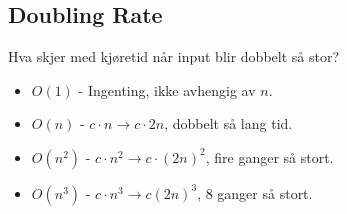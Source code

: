 \documentclass{article}
\begin{document}
\subsection{Doubling Rate}
Hva skjer med kjøretid når input blir dobbelt så stor?

\begin{itemize}
    \item \( O\left( 1 \right) \) - Ingenting, ikke avhengig av \( n \).
    \item \( O\left( n \right) \) - \( c \cdot  n \rightarrow c \cdot  2n \), dobbelt så lang tid.
    \item \( O\left( n^2 \right) \) - \( c \cdot n^2 \rightarrow c \cdot \left( 2n \right)^2 \), fire ganger så stort.
    \item \( O\left( n^3 \right) \) - \( c \cdot n^3 \rightarrow c\left( 2n \right)^3 \), 8 ganger så stort.
\end{itemize}
\end{document}
